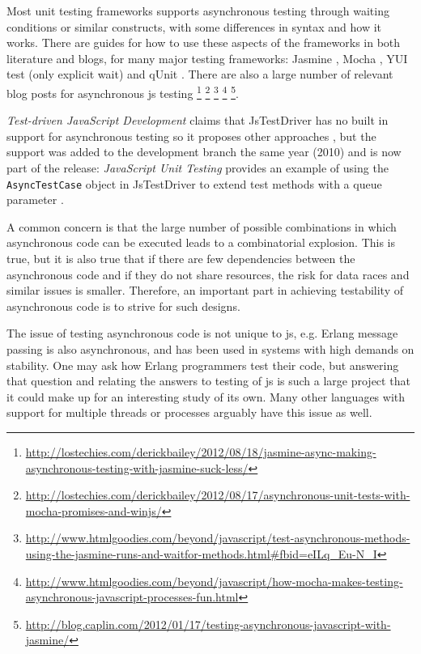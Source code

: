 \documentclass[11pt]{article}
\begin{document}
Most unit testing frameworks supports asynchronous testing through waiting conditions or similar constructs, with some differences in syntax and how it works. There are guides for how to use these aspects of the frameworks in both literature and blogs, for many major testing frameworks: Jasmine \cite[p.~35]{JasmineBook}\cite[p.~45-49]{JSUT}, Mocha \cite[p.~59-65]{UsingNode}, YUI test (only explicit wait) \cite[p.~78-79]{JSUT} and qUnit \cite[p.~114-116]{JSUT}. There are also a large number of relevant blog posts for asynchronous \gls{js} testing
\footnote{\url{http://lostechies.com/derickbailey/2012/08/18/jasmine-async-making-asynchronous-testing-with-jasmine-suck-less/}}
\footnote{\url{http://lostechies.com/derickbailey/2012/08/17/asynchronous-unit-tests-with-mocha-promises-and-winjs/}}
\footnote{\url{http://www.htmlgoodies.com/beyond/javascript/test-asynchronous-methods-using-the-jasmine-runs-and-waitfor-methods.html\#fbid=eILq_Eu-N_I}}
\footnote{\url{http://www.htmlgoodies.com/beyond/javascript/how-mocha-makes-testing-asynchronous-javascript-processes-fun.html}}
\footnote{\url{http://blog.caplin.com/2012/01/17/testing-asynchronous-javascript-with-jasmine/}}. %

\emph{Test-driven JavaScript Development} claims that JsTestDriver has no built in support for asynchronous testing so it proposes other approaches \cite[p.~247-387]{Tddjs}, but the support was added to the development branch the same year (2010) and is now part of the release: \emph{JavaScript Unit Testing} provides an example of using the \texttt{AsyncTestCase} object in JsTestDriver to extend test methods with a queue parameter \cite[p.~143-145]{JSUT}.

A common concern is that the large number of possible combinations in which asynchronous code can be executed leads to a combinatorial explosion. This is true, but it is also true that if there are few dependencies between the asynchronous code and if they do not share resources, the risk for data races and similar issues is smaller. Therefore, an important part in achieving testability of asynchronous code is to strive for such designs.

The issue of testing asynchronous code is not unique to \gls{js}, e.g. Erlang message passing is also asynchronous, and has been used in systems with high demands on stability. One may ask how Erlang programmers test their code, but answering that question and relating the answers to testing of \gls{js} is such a large project that it could make up for an interesting study of its own. Many other languages with support for multiple threads or processes arguably have this issue as well.
\end{document}
